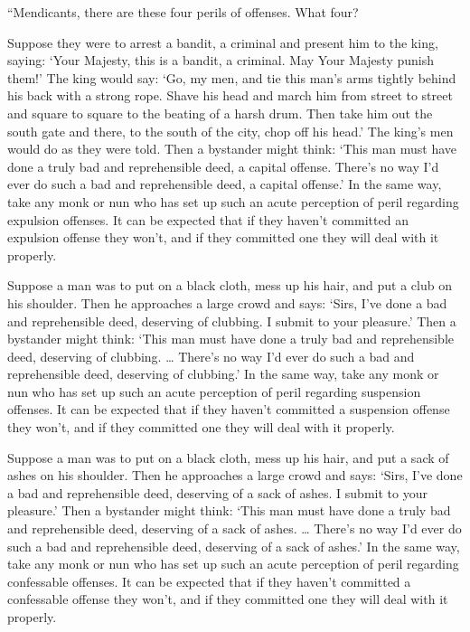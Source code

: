 \documentclass[12pt,openany]{book}%
\begin{document}
“Mendicants, there are these four perils of offenses. What four? 

Suppose they were to arrest a bandit, a criminal and present him to the king, saying: ‘Your Majesty, this is a bandit, a criminal. May Your Majesty punish them!’ The king would say: ‘Go, my men, and tie this man’s arms tightly behind his back with a strong rope. Shave his head and march him from street to street and square to square to the beating of a harsh drum. Then take him out the south gate and there, to the south of the city, chop off his head.’ The king’s men would do as they were told. Then a bystander might think: ‘This man must have done a truly bad and reprehensible deed, a capital offense. There’s no way I’d ever do such a bad and reprehensible deed, a capital offense.’ In the same way, take any monk or nun who has set up such an acute perception of peril regarding expulsion offenses. It can be expected that if they haven’t committed an expulsion offense they won’t, and if they committed one they will deal with it properly. 

Suppose a man was to put on a black cloth, mess up his hair, and put a club on his shoulder. Then he approaches a large crowd and says: ‘Sirs, I’ve done a bad and reprehensible deed, deserving of clubbing. I submit to your pleasure.’ Then a bystander might think: ‘This man must have done a truly bad and reprehensible deed, deserving of clubbing. … There’s no way I’d ever do such a bad and reprehensible deed, deserving of clubbing.’ In the same way, take any monk or nun who has set up such an acute perception of peril regarding suspension offenses. It can be expected that if they haven’t committed a suspension offense they won’t, and if they committed one they will deal with it properly. 

Suppose a man was to put on a black cloth, mess up his hair, and put a sack of ashes on his shoulder. Then he approaches a large crowd and says: ‘Sirs, I’ve done a bad and reprehensible deed, deserving of a sack of ashes. I submit to your pleasure.’ Then a bystander might think: ‘This man must have done a truly bad and reprehensible deed, deserving of a sack of ashes. … There’s no way I’d ever do such a bad and reprehensible deed, deserving of a sack of ashes.’ In the same way, take any monk or nun who has set up such an acute perception of peril regarding confessable offenses. It can be expected that if they haven’t committed a confessable offense they won’t, and if they committed one they will deal with it properly. 
\end{document}
